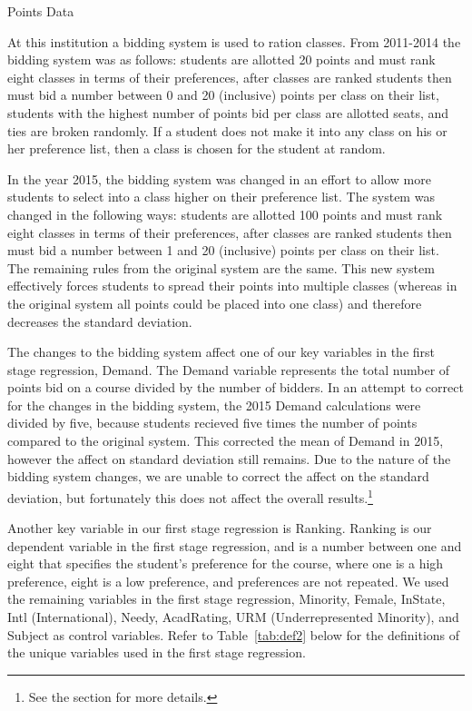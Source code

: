 \documentclass[12pt,a4paper,english,fleqn]{article}
\makeatletter
\newcommand{\tablelabel}[1]{Table~\ref{#1}}
\renewcommand\subsection{\@startsection{subsection}{2}
{\z@}{-3.25ex\@plus -1ex \@minus -.2ex}{1.5ex \@plus .2ex}{\normalfont\bf}}
\makeatother
\begin{document}
\clearpage{}

\subsection{Points Data}\label{pointsdata}

At this institution a bidding system is used to ration classes. 
From 2011-2014 the bidding system was as follows: 
students are allotted 20 points and must rank eight classes in terms of their preferences, 
after classes are ranked students then must bid a number between 0 and 20 (inclusive) points per class on their list, 
students with the highest number of points bid per class are allotted seats, and ties are broken randomly. 
If a student does not make it into any class on his or her preference list, then a class is chosen for the student at random. 

In the year 2015, the bidding system was changed in an effort to allow more students to select into a class higher on their preference list. 
The system was changed in the following ways:
students are allotted 100 points and must rank eight classes in terms of their preferences,
after classes are ranked students then must bid a number between 1 and 20 (inclusive) points per class on their list.
The remaining rules from the original system are the same. 
This new system effectively forces students to spread their points into multiple classes (whereas in the original system all points could be placed into one class) and therefore decreases the standard deviation.

The changes to the bidding system affect one of our key variables in the first stage regression, Demand. 
The Demand variable represents the total number of points bid on a course divided by the number of bidders. 
In an attempt to correct for the changes in the bidding system, the 2015 Demand calculations were divided by five, because students recieved five times the number of points compared to the original system. 
This corrected the mean of Demand in 2015, however the affect on standard deviation still remains. 
Due to the nature of the bidding system changes, we are unable to correct the affect on the standard deviation, but fortunately this does not affect the overall results.\footnote{See the  section for more details.} 

Another key variable in our first stage regression is Ranking. 
Ranking is our dependent variable in the first stage regression, and is a number between one and eight that specifies the student's preference for the course, where one is a high preference, eight is a low preference, and preferences are not repeated. 
We used the remaining variables in the first stage regression, Minority, Female, InState, Intl (International), Needy, AcadRating, URM (Underrepresented Minority), and Subject as control variables. Refer to \tablelabel{tab:def2} below for the definitions of the unique variables used in the first stage regression. 
\end{document}
